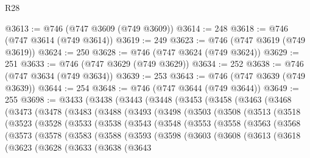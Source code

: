 \begin{lexlean}{R28}
\begin{coremodule}
@3613 := @746 (@747 @3609 (@749 @3609))
@3614 := 248
@3618 := @746 (@747 @3614 (@749 @3614))
@3619 := 249
@3623 := @746 (@747 @3619 (@749 @3619))
@3624 := 250
@3628 := @746 (@747 @3624 (@749 @3624))
@3629 := 251
@3633 := @746 (@747 @3629 (@749 @3629))
@3634 := 252
@3638 := @746 (@747 @3634 (@749 @3634))
@3639 := 253
@3643 := @746 (@747 @3639 (@749 @3639))
@3644 := 254
@3648 := @746 (@747 @3644 (@749 @3644))
@3649 := 255
@3698 := @3433
    (@3438
      (@3443
        (@3448
          (@3453
            (@3458
              (@3463
                (@3468
                  (@3473
                    (@3478
                      (@3483
                        (@3488
                          (@3493
                            (@3498
                              (@3503
                                (@3508
                                  (@3513
                                    (@3518
                                      (@3523
                                        (@3528
                                          (@3533
                                            (@3538
                                              (@3543
                                                (@3548
                                                  (@3553
                                                    (@3558
                                                      (@3563
                                                        (@3568
                                                          (@3573
                                                            (@3578
                                                              (@3583
                                                                (@3588
                                                                  (@3593
                                                                    (@3598
                                                                      (@3603
                                                                        (@3608
                                                                          (@3613
                                                                            (@3618
                                                                              (@3623
                                                                                (@3628
                                                                                  (@3633
                                                                                    (@3638
                                                                                      (@3643

\end{coremodule}
\end{lexlean}
